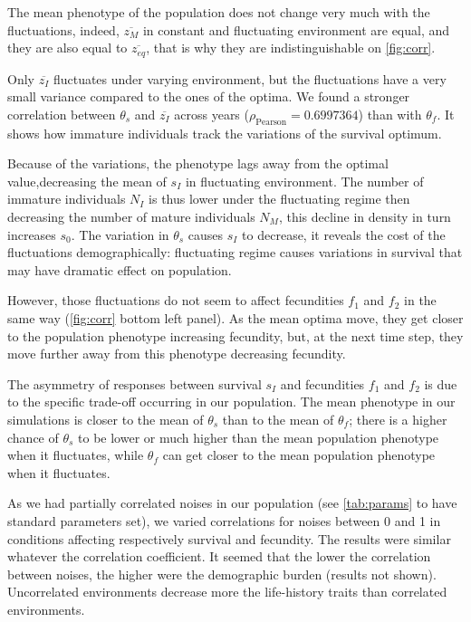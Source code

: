 The mean phenotype of the population does not change very much with the fluctuations, indeed, $\overline{z_M}$ in constant and fluctuating environment are equal, and they are also equal to $\overline{z_{eq}}$, that is why they are indistinguishable on \autoref{fig:corr}.

Only $\overline{z_I}$ fluctuates under varying environment, but the fluctuations have a very small variance compared to the ones of the optima. We found a stronger correlation between $\theta_s$ and $\overline{z_I}$ across years ($\rho_{\text{Pearson}} = 0.6997364$) than with $\theta_f$. It shows how immature individuals track the variations of the survival optimum.

Because of the variations, the phenotype lags away from the optimal value,decreasing the mean of $s_I$ in fluctuating environment. The number of immature individuals $N_I$ is thus lower under the fluctuating regime then decreasing the number of mature individuals $N_M$, this decline in density in turn increases $s_0$. The variation in $\theta_s$ causes $s_I$ to decrease, it reveals the cost of the fluctuations demographically: fluctuating regime causes variations in survival that may have dramatic effect on population.

However, those fluctuations do not seem to affect fecundities $f_1$ and $f_2$ in the same way (\autoref{fig:corr} bottom left panel). As the mean optima move, they get closer to the population phenotype increasing fecundity, but, at the next time step, they move further away from this phenotype decreasing fecundity.

The asymmetry of responses between survival $s_I$ and fecundities $f_1$ and $f_2$ is due to the specific trade-off occurring in our population. The mean phenotype in our simulations is closer to the mean of $\theta_s$ than to the mean of $\theta_f$; there is a higher chance of $\theta_s$ to be lower or much higher than the mean population phenotype when it fluctuates, while $\theta_f$ can get closer to the mean population phenotype when it fluctuates.

As we had partially correlated noises in our population (see \autoref{tab:params} to have standard parameters set), we varied correlations for noises between 0 and 1 in conditions affecting respectively survival and fecundity. The results were similar whatever the correlation coefficient. It seemed that the lower the correlation between noises, the higher were the demographic burden (results not shown). Uncorrelated environments decrease more the life-history traits than correlated environments.

